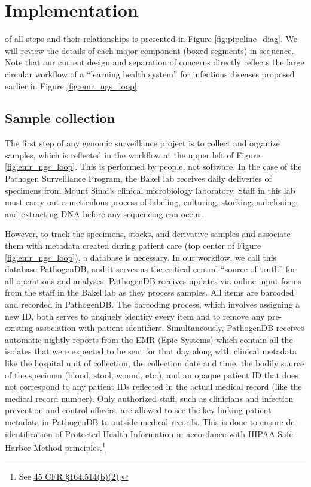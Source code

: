 \section{Implementation}

 of all steps and their relationships is presented in Figure \ref{fig:pipeline_diag}. We will review the details of each major component (boxed segments) in sequence. Note that our current design and separation of concerns directly reflects the large circular workflow of a ``learning health system'' for infectious diseases proposed earlier in Figure \ref{fig:emr_ngs_loop}.

\subsection{Sample collection}

The first step of any genomic surveillance project is to collect and organize samples, which is reflected in the workflow at the upper left of Figure \ref{fig:emr_ngs_loop}. This is performed by people, not software. In the case of the Pathogen Surveillance Program, the Bakel lab receives daily deliveries of specimens from Mount Sinai's clinical microbiology laboratory. Staff in this lab must carry out a meticulous process of labeling, culturing, stocking, subcloning, and extracting DNA before any sequencing can occur.

However, to track the specimens, stocks, and derivative samples and associate them with metadata created during patient care (top center of Figure \ref{fig:emr_ngs_loop}), a database is necessary. In our workflow, we call this database PathogenDB, and it serves as the critical central ``source of truth'' for all operations and analyses. PathogenDB receives updates via online input forms from the staff in the Bakel lab as they process samples. All items are barcoded and recorded in PathogenDB. The barcoding process, which involves assigning a new ID, both serves to unqiuely identify every item and to remove any pre-existing association with patient identifiers. Simultaneously, PathogenDB receives automatic nightly reports from the EMR (Epic Systems) which contain all the isolates that were expected to be sent for that day along with clinical metadata like the hospital unit of collection, the collection date and time, the bodily source of the specimen (blood, stool, wound, etc.), and an opaque patient ID that does not correspond to any patient IDs reflected in the actual medical record (like the medical record number). Only authorized staff, such as clinicians and infection prevention and control officers, are allowed to see the key linking patient metadata in PathogenDB to outside medical records. This is done to ensure de-identification of Protected Health Information in accordance with HIPAA Safe Harbor Method principles.\footnote{See \href{https://www.law.cornell.edu/cfr/text/45/164.514}{45 CFR §164.514(b)(2)}.}


